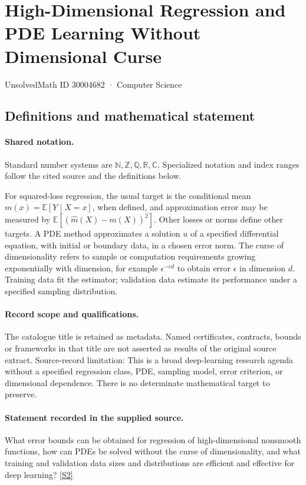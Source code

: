 \documentclass[11pt]{article}
\newcommand{\sref}[2]{\hyperlink{source:#1:#2}{[S#2]}}
\begin{document}
\setcounter{section}{30004681}
\section{High-Dimensional Regression and PDE Learning Without Dimensional Curse}\label{30004682}
{\small\sffamily UnsolvedMath ID 30004682 · Computer Science}
\subsection{Definitions and mathematical statement}

\paragraph{Shared notation.}Standard number systems are $\mathbb N,\mathbb Z,\mathbb Q,\mathbb R,\mathbb C$. Specialized notation and index ranges follow the cited source and the definitions below.


For squared-loss regression, the usual target is the conditional mean $m(x)=\mathbb E[Y\mid X=x]$, when defined, and approximation error may be measured by $\mathbb E[(\widehat m(X)-m(X))^2]$. Other losses or norms define other targets. A PDE method approximates a solution $u$ of a specified differential equation, with initial or boundary data, in a chosen error norm. The curse of dimensionality refers to sample or computation requirements growing exponentially with dimension, for example $\epsilon^{-c d}$ to obtain error $\epsilon$ in dimension $d$. Training data fit the estimator; validation data estimate its performance under a specified sampling distribution.
\paragraph{Record scope and qualifications.}
The catalogue title is retained as metadata. Named certificates, contracts, bounds or frameworks in that title are not asserted as results of the original source extract.
Source-record limitation: This is a broad deep-learning research agenda without a specified regression class, PDE, sampling model, error criterion, or dimensional dependence. There is no determinate mathematical target to preserve.
\paragraph{Statement recorded in the supplied source.}
What error bounds can be obtained for regression of high-dimensional nonsmooth functions, how can PDEs be solved without the curse of dimensionality, and what training and validation data sizes and distributions are efficient and effective for deep learning? \sref{30004682}{2}
\end{document}
